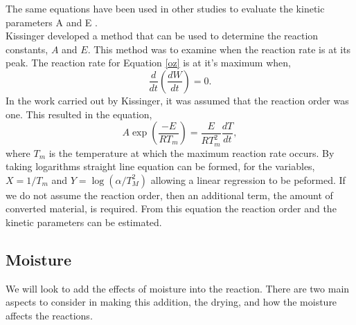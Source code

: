 The same equations have been used in other studies to evaluate the kinetic parameters A and E \cite{carrasco93,kissinger56,sbirrazzuoli97}.\\
Kissinger \cite{kissinger56} developed a method that can be used to determine the reaction constants, $A$ and $E$. This method was to examine when the reaction rate is at its peak. The reaction rate for Equation \eqref{oz} is at it's maximum when, 
\begin{equation}
\frac{d}{dt}\left(\frac{dW}{dt}\right)=0.
\end{equation}
In the work carried out by Kissinger, it was assumed that the reaction order was one. This resulted in the equation,
\begin{equation}
A\exp\left(\frac{-E}{RT_m}\right)=\frac{E}{RT_m^2}\frac{dT}{dt},
\end{equation}
where $T_m$ is the temperature at which the maximum reaction rate occurs. By taking logarithms straight line equation can be formed, for the variables, $X=1/T_m$ and $Y=\log\left(\alpha/T_M^2\right)$ allowing a linear regression to be peformed. If we do not assume the reaction order, then an additional term, the amount of converted material, is required. From this equation the reaction order and the kinetic parameters can be estimated. \\

\subsection{Moisture}
We will look to add the effects of moisture into the reaction. There are two main aspects to consider in making this addition, the drying, and how the moisture affects the reactions. 
